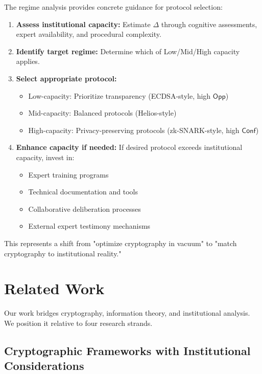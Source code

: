 \documentclass{ieeeaccess}
\newcommand{\Conf}{\mathsf{Conf}}
\newcommand{\Opp}{\mathsf{Opp}}
\begin{document}
The regime analysis provides concrete guidance for protocol selection:

\begin{enumerate}
\item \textbf{Assess institutional capacity:} Estimate $\Delta$ through cognitive assessments, expert availability, and procedural complexity.

\item \textbf{Identify target regime:} Determine which of Low/Mid/High capacity applies.

\item \textbf{Select appropriate protocol:}
\begin{itemize}
\item Low-capacity: Prioritize transparency (ECDSA-style, high $\Opp$)
\item Mid-capacity: Balanced protocols (Helios-style)
\item High-capacity: Privacy-preserving protocols (zk-SNARK-style, high $\Conf$)
\end{itemize}

\item \textbf{Enhance capacity if needed:} If desired protocol exceeds institutional capacity, invest in:
\begin{itemize}
\item Expert training programs
\item Technical documentation and tools
\item Collaborative deliberation processes
\item External expert testimony mechanisms
\end{itemize}
\end{enumerate}

This represents a shift from "optimize cryptography in vacuum" to "match cryptography to institutional reality."

\section{Related Work}\label{sec:related_work}

Our work bridges cryptography, information theory, and institutional analysis. We position it relative to four research strands.

\subsection{Cryptographic Frameworks with Institutional Considerations}
\end{document}
